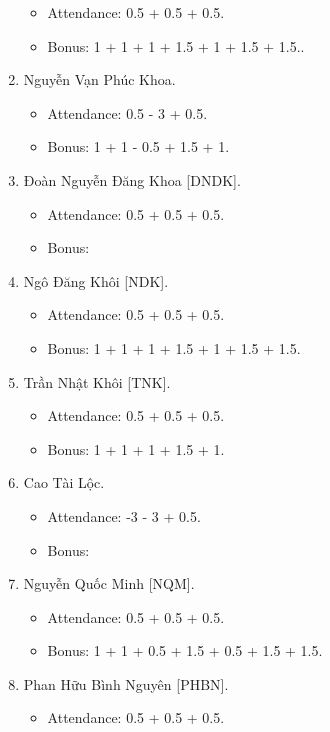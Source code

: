 \documentclass{article}
\begin{document}
\begin{enumerate}
    \begin{itemize}
        \item Attendance: 0.5 + 0.5 + 0.5.
        \item Bonus: 1 + 1 + 1 + 1.5 + 1 + 1.5 + 1.5..
    \end{itemize}
    \item {\sc Nguyễn Vạn Phúc Khoa.}
    \begin{itemize}
        \item Attendance: 0.5 - 3 + 0.5.
        \item Bonus: 1 + 1 - 0.5 + 1.5 + 1.
    \end{itemize}
    \item {\sc Đoàn Nguyễn Đăng Khoa [DNDK].}
    \begin{itemize}
        \item Attendance: 0.5 + 0.5 + 0.5.
        \item Bonus:
    \end{itemize}
    \item {\sc Ngô Đăng Khôi [NDK].}
    \begin{itemize}
        \item Attendance: 0.5 + 0.5 + 0.5.
        \item Bonus: 1 + 1 + 1 + 1.5 + 1 + 1.5 + 1.5.
    \end{itemize}
    \item {\sc Trần Nhật Khôi [TNK].}
    \begin{itemize}
        \item Attendance: 0.5 + 0.5 + 0.5.
        \item Bonus: 1 + 1 + 1 + 1.5 + 1.
    \end{itemize}
    \item {\sc Cao Tài Lộc.}
    \begin{itemize}
        \item Attendance: -3 - 3 + 0.5.
        \item Bonus:
    \end{itemize}
    \item {\sc Nguyễn Quốc Minh [NQM].}
    \begin{itemize}
        \item Attendance: 0.5 + 0.5 + 0.5.
        \item Bonus: 1 + 1 + 0.5 + 1.5 + 0.5 + 1.5 + 1.5.
    \end{itemize}
    \item {\sc Phan Hữu Bình Nguyên [PHBN].}
    \begin{itemize}
        \item Attendance: 0.5 + 0.5 + 0.5.

\end{itemize}
\end{enumerate}
\end{document}
